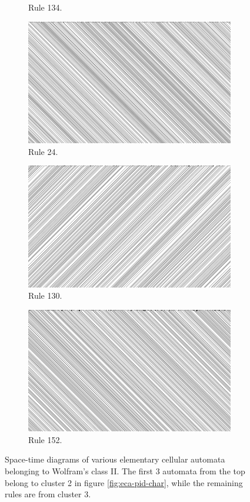 \documentclass[12pt]{article}
\begin{document}
\begin{figure} [!h]
\begin{subfigure}{.5\textwidth}
  \caption{Rule 134.}
  \label{fig:rule134}
\end{subfigure}
\begin{subfigure}{.5\textwidth}
  \centering
  \includegraphics[width=.9\linewidth]{rule24}
  \caption{Rule 24.}
  \label{fig:rule24}
\end{subfigure}
\begin{subfigure}{.5\textwidth}
  \centering
  \includegraphics[width=.9\linewidth]{rule130}
  \caption{Rule 130.}
  \label{fig:rule130}
\end{subfigure}
\begin{subfigure}{.5\textwidth}
  \centering
  \includegraphics[width=.9\linewidth]{rule152}
  \caption{Rule 152.}
  \label{fig:rule152}
\end{subfigure}
\caption{Space-time diagrams of various elementary cellular automata belonging to Wolfram's class II. The first 3 automata from the top belong to cluster 2 in figure \ref{fig:eca-pid-char}, while the remaining rules are from cluster 3.}
\label{fig:eca-diagonal-rules}
\end{figure}
\end{document}
